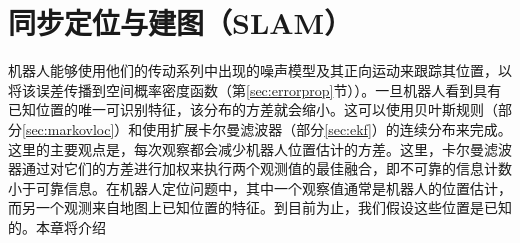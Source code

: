 \chapter{同步定位与建图（SLAM）}\label{chap:slam}

机器人能够使用他们的传动系列中出现的噪声模型及其正向运动来跟踪其位置，以将该误差传播到空间概率密度函数（第\ref {sec:errorprop}节））。一旦机器人看到具有已知位置的唯一可识别特征，该分布的方差就会缩小。这可以使用贝叶斯规则（部分\ref {sec:markovloc}）和使用扩展卡尔曼滤波器（部分\ref {sec:ekf}）的连续分布来完成。这里的主要观点是，每次观察都会减少机器人位置估计的方差。这里，卡尔曼滤波器通过对它们的方差进行加权来执行两个观测值的最佳融合，即不可靠的信息计数小于可靠信息。在机器人定位问题中，其中一个观察值通常是机器人的位置估计，而另一个观测来自地图上已知位置的特征。到目前为止，我们假设这些位置是已知的。本章将介绍


